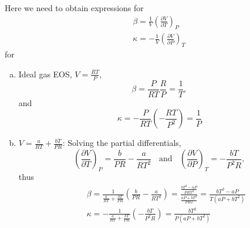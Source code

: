\documentclass[12pts,a4paper,amsmath,amssymb,floatfix]{article}%
\newcommand{\frc}{\displaystyle\frac}
\begin{document}
\begin{enumerate}[1)]
         Here we need to obtain expressions for 
           \begin{eqnarray}
                && \beta = \frc{1}{V}\left(\frc{\partial V}{\partial T}\right)_{P} \nonumber \\
                && \kappa = -\frc{1}{V}\left(\frc{\partial V}{\partial P}\right)_{T} \nonumber
           \end{eqnarray}
           for 
           \begin{enumerate}[a)]
%
               \item Ideal gas EOS, $V=\frc{R T}{P}$,
                    \begin{displaymath}
                       \beta =\frc{P}{R T}\frc{R}{P} = \frc{1}{T},
                    \end{displaymath}
                    and 
                    \begin{displaymath}
                       \kappa = -\frc{P}{R T}\left(-\frc{R T}{P^{2}}\right) = \frc{1}{P}
                    \end{displaymath}
%
               \item $V=\frc{a}{RT}+\frc{bT}{PR}$: Solving the partial differentials,
                    \begin{displaymath}
                       \left(\frc{\partial V}{\partial T}\right)_{P} = \frc{b}{PR}-\frc{a}{RT^{2}}\;\;\text{ and }\;\; \left(\frc{\partial V}{\partial P}\right)_{T} = -\frc{bT}{P^{2}R},
                    \end{displaymath}
                    thus
                    \begin{eqnarray}
                       && \beta =\frc{1}{\frc{a}{RT}+\frc{bT}{PR}}\left(\frc{b}{PR}-\frc{a}{RT^{2}}\right) = \frc{\frc{bT^{2}-aP}{PRT^{2}}}{\frc{aP+bT^{2}}{PRT}} = \frc{bT^{2}-aP}{T\left(aP+bT^{2}\right)}
 \nonumber \\
                       && \kappa = -\frc{1}{\frc{a}{RT}+\frc{bT}{PR}} \left(-\frc{bT}{P^{2}R}\right) = \frc{bT^{2}}{P\left(aP+bT^{2}\right)} \nonumber
                    \end{eqnarray}
                    
%
           \end{enumerate}
%     
\end{enumerate}

\clearpage
\end{document}
